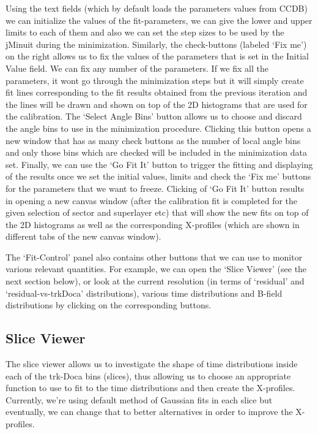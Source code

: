 \documentclass[12pt,epsfig]{article}
\begin{document}
Using the text fields (which by default loads the parameters values from CCDB) we can initialize the values of the fit-parameters, we can give the lower and upper limits to each of them and also we can set the step sizes to be used by the jMinuit during the minimization. Similarly, the check-buttons (labeled `Fix me') on the right allows us to fix the values of the parameters that is set in the Initial Value field. We can fix any number of the parameters. If we fix all the parameters, it wont go through the minimization steps but it will simply create fit lines corresponding to the fit results obtained from the previous iteration and the lines will be drawn and shown on top of the 2D histograms that are used for the calibration. The `Select Angle Bins' button allows us to choose and discard the angle bins to use in the minimization procedure. Clicking this button opens a new window that has as many check buttons as the number of local angle bins and only those bins which are checked will be included in the minimization data set. Finally, we can use the `Go Fit It' button to trigger the fitting and displaying of the results once we set the initial values, limits and check the `Fix me' buttons for the parameters that we want to freeze. Clicking of `Go Fit It' button results in opening a new canvas window (after the calibration fit is completed for the given selection of sector and superlayer etc) that will show the new fits on top of the 2D histograms as well as the corresponding X-profiles (which are shown in different tabs of the new canvas window).


The `Fit-Control' panel also contains other buttons that we can use to monitor various relevant quantities. For example, we can open the `Slice Viewer' (see the next section below), or look at the current resolution (in terms of `residual' and `residual-vs-trkDoca' distributions), various time distributions and B-field distributions by clicking on the corresponding buttons.


\subsection{Slice Viewer}

The slice viewer allows us to investigate the shape of time distributions inside each of the trk-Doca bins (slices), thus allowing us to choose an appropriate function to use to fit to the time distributions and then create the X-profiles. Currently, we're using default method of Gaussian fits in each slice but eventually, we can change that to better alternatives in order to improve the X-profiles.
\end{document}
